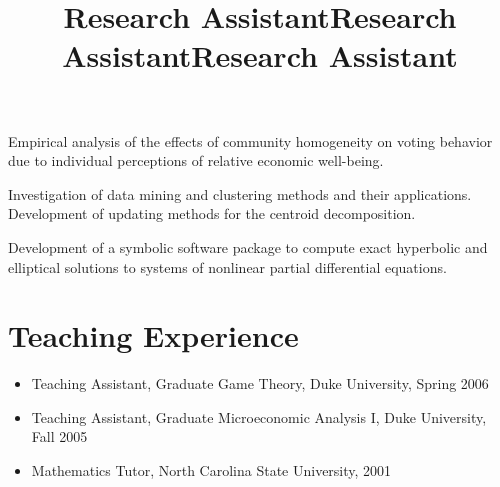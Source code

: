 \documentclass[overlapped,line,final,11pt,letterpaper]{res}
\begin{document}
\begin{resume}
%

\title{Research Assistant}
\begin{position}
  Empirical analysis of the effects of community homogeneity on voting
  behavior due to individual perceptions of relative economic
  well-being.
\end{position}

\title{Research Assistant}
\begin{position}
  Investigation of data mining and clustering methods and their
  applications. Development of updating methods for the centroid
  decomposition.
\end{position}

\title{Research Assistant}
\begin{position}
  Development of a symbolic software package to compute exact
  hyperbolic and elliptical solutions to systems of nonlinear partial
  differential equations.
\end{position}


\section{\bf Teaching Experience}

\begin{itemize}
\item Teaching Assistant, Graduate Game Theory, Duke University, Spring 2006
\item Teaching Assistant, Graduate Microeconomic Analysis I, Duke
  University, Fall 2005
\item Mathematics Tutor, North Carolina State University, 2001
\end{itemize}



\end{resume}
\end{document}
